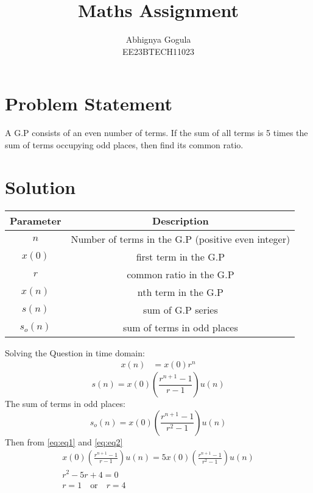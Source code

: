 \documentclass{article}
\begin{document}
\title{Maths Assignment}
\author{Abhignya Gogula\\
        EE23BTECH11023}
\maketitle
\section*{Problem Statement}
A G.P consists of an even number of terms. If the sum of all terms is 5 times the sum of terms occupying odd places, then find its common ratio.
\section*{Solution}
\begin{table}[h!]
\centering
\begin{tabular}{|c|c|}
\hline
Parameter & Description \\
\hline
\( n \) & Number of terms in the G.P (positive even integer) \\
\hline
\(x(0) \) & first term in the G.P \\
\hline
\( r \) & common ratio in the G.P \\
\hline
\( x(n) \) & nth term in the G.P \\
\hline
\( s(n) \) & sum of G.P series \\
\hline
\( s_o(n) \) & sum of terms in odd places\\
\hline
\end{tabular}
\end{table}
Solving the Question in time domain:
\begin{align}
x(n) &= x(0)r^n 
\end{align}
\begin{equation}
s(n) = x(0)(\frac{r^{n+1}-1}{r-1})u(n)
\label{eq:eq1}
\end{equation}
The sum of terms in odd places:
\begin{equation}
s_o(n) = x(0)\left(\frac{r^{n+1}-1}{r^2-1}\right)u(n)
\label{eq:eq2}
\end{equation}
Then from \eqref{eq:eq1} and \eqref{eq:eq2}
\begin{align}
x(0)(\frac{r^{n+1}-1}{r-1})u(n)=5x(0)(\frac{r^{n+1}-1}{r^2-1})u(n)\\
r^2-5r+4=0\\
r=1 \quad \text{or} \quad r=4
\end{align}
\end{document}
